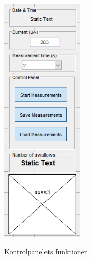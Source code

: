 \begin{figure}[H]
\centering
{\includegraphics[width=4cm]
{Figure/designGuikontrol}}
\caption{Kontrolpanelets funktioner}
\label{Fig:designGuikontrol}
\end{figure} 















